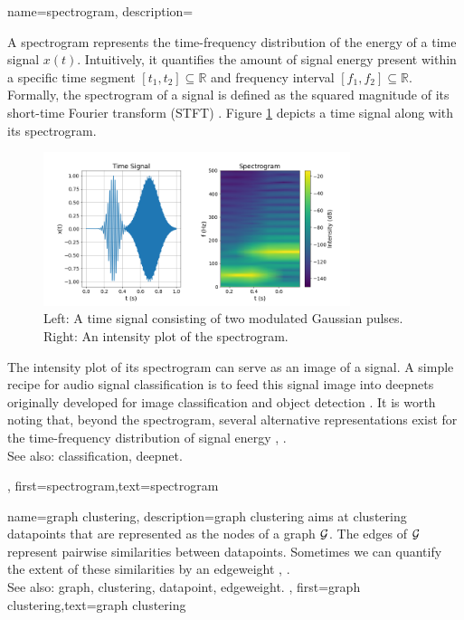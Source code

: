 {name={spectrogram},
	description={
		A spectrogram represents the time-frequency distribution of the energy of a time signal $x(t)$.  
		Intuitively, it quantifies the amount of signal energy present within a specific time segment 
		$[t_{1},t_{2}] \subseteq \mathbb{R}$ and frequency interval $[f_{1},f_{2}]\subseteq \mathbb{R}$. 
		Formally, the spectrogram of a signal is defined as the squared magnitude of its 
		short-time Fourier transform (STFT) \cite{cohen1995time}.
        Figure \ref{fig:spectrogram_dict} depicts a time signal along with its spectrogram. 
	\begin{figure}[H]
		\centering
		\includegraphics[width=0.8\textwidth]{assets/spectrogram.png}
		\caption{Left: A time signal consisting of two modulated Gaussian pulses. Right: An intensity 
		plot of the spectrogram.
		\label{fig:spectrogram_dict}}
	\end{figure}
        The intensity plot of its spectrogram can serve as an image of a signal. A 
		simple recipe for audio signal \gls{classification} is to feed this signal image 
		into \glspl{deepnet} originally developed for image \gls{classification} and object detection \cite{Li:2022aa}. 
		It is worth noting that, beyond the spectrogram, several alternative representations exist 
		for the time-frequency distribution of signal energy \cite{TimeFrequencyAnalysisBoashash}, \cite{MallatBook}.
					\\ 
		See also: \gls{classification}, \gls{deepnet}.
		}, 
	first={spectrogram},text={spectrogram} 
}

{name={graph clustering},
	description={\Gls{graph} \gls{clustering} aims at 
		\gls{clustering} \glspl{datapoint} that are represented as the nodes 
		of a \gls{graph} $\mathcal{G}$. The edges of $\mathcal{G}$ represent 
		pairwise similarities between \glspl{datapoint}. Sometimes we
		can quantify the extent of these similarities by an \gls{edgeweight} \cite{FlowSpecClustering2021}, \cite{Luxburg2007}.
					\\ 
		See also: \gls{graph}, \gls{clustering}, \gls{datapoint}, \gls{edgeweight}. }, 
	first={graph clustering},text={graph clustering} 
}

